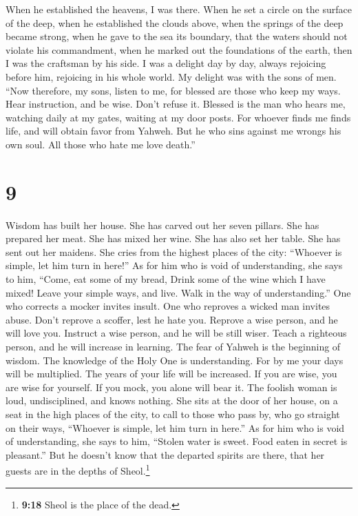  When he established the heavens, I was there. When he
set a circle on the surface of the deep,  when he
established the clouds above, when the springs of the deep became
strong,  when he gave to the sea its boundary, that the
waters should not violate his commandment, when he marked out the
foundations of the earth,  then I was the craftsman by
his side. I was a delight day by day, always rejoicing before him,
 rejoicing in his whole world. My delight was with the
sons of men.  ``Now therefore, my sons, listen to me, for
blessed are those who keep my ways.  Hear instruction,
and be wise. Don't refuse it.  Blessed is the man who
hears me, watching daily at my gates, waiting at my door posts.
 For whoever finds me finds life, and will obtain favor
from Yahweh.  But he who sins against me wrongs his own
soul. All those who hate me love death.''

\hypertarget{section-8}{%
\section{9}\label{section-8}}

 Wisdom has built her house. She has carved out her seven
pillars.  She has prepared her meat. She has mixed her
wine. She has also set her table.  She has sent out her
maidens. She cries from the highest places of the city: 
``Whoever is simple, let him turn in here!'' As for him who is void of
understanding, she says to him,  ``Come, eat some of my
bread, Drink some of the wine which I have mixed!  Leave
your simple ways, and live. Walk in the way of understanding.''
 One who corrects a mocker invites insult. One who
reproves a wicked man invites abuse.  Don't reprove a
scoffer, lest he hate you. Reprove a wise person, and he will love you.
 Instruct a wise person, and he will be still wiser. Teach
a righteous person, and he will increase in learning. 
The fear of Yahweh is the beginning of wisdom. The knowledge of the Holy
One is understanding.  For by me your days will be
multiplied. The years of your life will be increased.  If
you are wise, you are wise for yourself. If you mock, you alone will
bear it.  The foolish woman is loud, undisciplined, and
knows nothing.  She sits at the door of her house, on a
seat in the high places of the city,  to call to those
who pass by, who go straight on their ways,  ``Whoever is
simple, let him turn in here.'' As for him who is void of understanding,
she says to him,  ``Stolen water is sweet. Food eaten in
secret is pleasant.''  But he doesn't know that the
departed spirits are there, that her guests are in the depths of
Sheol.\footnote{\textbf{9:18} Sheol is the place of the dead.}

